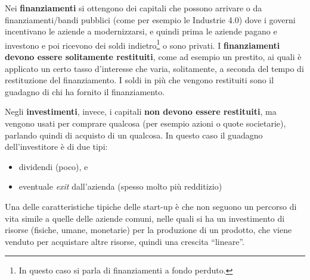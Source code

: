 Nei \textbf{finanziamenti} si ottengono dei capitali che possono arrivare o da
finanziamenti/bandi pubblici (come per esempio le Industrie 4.0) dove i governi
incentivano le aziende a modernizzarsi, e quindi prima le aziende pagano e
investono e poi ricevono dei soldi indietro\footnote{In questo caso si parla
di finanziamenti a fondo perduto.} o sono privati. I \textbf{finanziamenti
devono essere solitamente restituiti}, come ad esempio un prestito, ai quali è
applicato un certo tasso d'interesse che varia, solitamente, a seconda del
tempo di restituzione del finanziamento. I soldi in più che vengono restituiti
sono il guadagno di chi ha fornito il finanziamento.

Negli \textbf{investimenti}, invece, i capitali \textbf{non devono essere
restituiti}, ma vengono usati per comprare qualcosa (per esempio azioni o quote
societarie), parlando quindi di acquisto di un qualcosa. In questo caso il
guadagno dell'investitore è di due tipi:
\begin{itemize}
	\item dividendi (poco), e
	\item eventuale \textit{exit} dall'azienda (spesso molto più redditizio)
\end{itemize}

\vspace{0.3cm}

\noindent Una delle caratteristiche tipiche delle start-up è che non seguono un
percorso di vita simile a quelle delle aziende comuni, nelle quali si ha un
investimento di risorse (fisiche, umane, monetarie) per la produzione di un
prodotto, che viene venduto per acquistare altre risorse, quindi una crescita
``lineare''.

